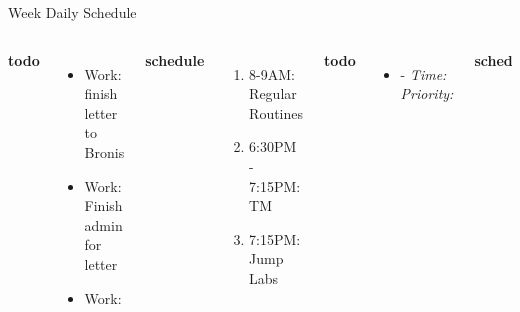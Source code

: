 \documentclass[serif, mathserif, final]{beamer}
\newcommand{\timeEst}[1]{\textit{Time:} \textit{#1}}
\newcommand{\priority}[1]{\textit{Priority:} \textit{#1}}
\newcommand{\deadline}[1]{#1}
\newcommand{\dl}[1]{#1}
\begin{document}
\begin{frame}{}
\begin{columns}
\begin{column}{0.50\linewidth}
\begin{block}{Week Daily Schedule}
\begin{columns}
  \textbf{\small todo}\\
  \begin{itemize} 
    \tiny \item \tiny Work: finish letter to Bronis
  \item \tiny Work: Finish admin for letter 
  \item \tiny Work:   
  \end{itemize}
  \textbf{\small schedule}\\
  \begin{enumerate} 
    \tiny \item \tiny 8-9AM: Regular Routines 
    \tiny \item 6:30PM - 7:15PM: TM 
    \tiny \item 7:15PM: Jump Labs 
  \end{enumerate} 
  
  \textbf{\small todo}\\ 
  \begin{itemize}
    \tiny \item \tiny -  \deadline{ }   \timeEst{}  \priority{} 
  \end{itemize}
  \textbf{\small schedule}\\
  \begin{enumerate}
    \tiny \item \tiny 8-9AM: Regular Routines 
  \end{enumerate}
  
  \textbf{\small todo}\\
  \begin{itemize}
    \tiny \item \tiny Work: finish writing slides 
  \item \tiny Work: comm: have Atul send pics  

  \item \tiny worklife: finish writing the comm + worklife: finish tm
    org \dl{wed} 
  \item \tiny Work: comm: finish writing to Bronish \dl{WedOrnextWed} 
  \item \tiny MGmt: Time: do planning draft for summer

  \end{itemize}
  \textbf{\small schedule}\\ 
  \begin{enumerate}
    \tiny \item \tiny 8-9AM: Regular Routines 
  \end{enumerate}
  

\end{columns}
\end{block}
\end{column}
\end{columns}
\end{frame}
\end{document}
